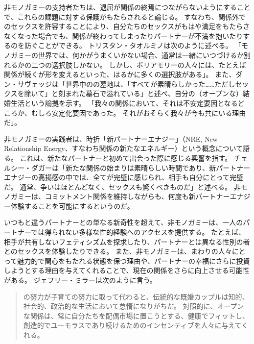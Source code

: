 \documentclass[paper=a4,book,openany]{jlreq}
\newcommand{\ig}[1]{}           %
\begin{document}
非モノガミーの支持者たちは、退屈が関係の終焉につながらないようにすることで、これらの課題に対する保護がもたらされると論じる。
すなわち、関係外でのセックスを許容することにより、自分たちのセックスがもはや満足をもたらさなくなった場合でも、関係が終わってしまったりパートナーが不満を抱いたりするのを防ぐことができる。
トリスタン・タオルミノは次のように述べる。
「モノガミーの世界では、何かがうまくいかない場合、通常は一緒にいつづけるか別れるかの二つの選択肢しかない。
しかし、ポリアモリーの人々には、たとえば関係が続くが形を変えるといった、はるかに多くの選択肢がある」\citep[p.217]{taormino08:_openin_up}。
また、ダン・サヴェッジは「世界中のの墓地は、「すべてが素晴らしかった……ただしセックスを除いて」と刻まれた墓石で溢れている」と述べ、自分の（オープンな）結婚生活という論拠を示す。
「我々の関係において、それは不安定要因となるどころか、むしろ安定化要因であった。
それがおそらく我々が今も共にいる理由だ」\citep{oppenheimer11:_married_infid}。

非モノガミーの実践者は、時折「新パートナーエナジー」（NRE, New Relationship Energy、すなわち関係の新たなエネルギー）という概念について語る。
これは、新たなパートナーと初めて出会った際に感じる興奮を指す。
チェルシー・ダガーは「新たな関係の始まりは素晴らしい時間であり、新パートナーエナジーの高揚感の中では、全てが完璧に感じられ、相手も自分にとって完璧だ。
通常、争いはほとんどなく、セックスも驚くべきものだ」と述べる\citep{dagger18:_weve_all_been_there}。
非モノガミーは、コミットメント関係を維持しながらも、何度も新パートナーエナジー体験することを可能にするというのだ。

いつもと違うパートナーとの単なる新奇性を超えて、非モノガミーは、一人のパートナーでは得られない多様な性的経験へのアクセスを提供する。
たとえば、相手が共有しないフェティシズムを探求したり、パートナーとは異なる性別の者とのセックスを体験したりできる。
また、非モノガミーは、まわりの人々にとって魅力的で関心をもたれる状態を保つ理由や、パートナーの幸福にさらに投資しようとする理由を与えてくれることで、現在の関係をさらに向上させる可能性がある。
ジェフリー・ミラー\ig{Geoffrey Miller}は次のように言う。

\begin{quote}
の努力が子育ての努力に取って代わると、伝統的な既婚カップルは知的、社会的、政治的な生活において怠惰になりがちだ。
対照的に、オープンな関係は、常に自分たちを配偶市場に置こうとする、健康でフィットし、創造的でユーモラスであり続けるためのインセンティブを人々に与えてくれる。
\citep{miller19:_polyam_is_growin}

\end{quote}
\end{document}
